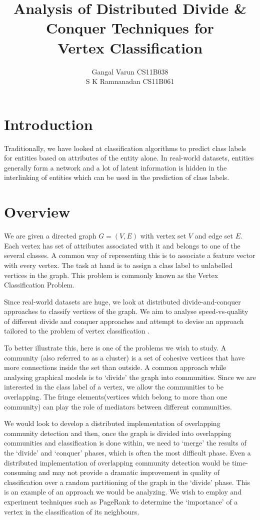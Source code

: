 \documentclass{article}
\begin{document}
\title{\textbf{Analysis of Distributed Divide \& Conquer Techniques for \\Vertex Classification}}
\author{ Gangal Varun CS11B038 \\
		 S K Ramnanadan CS11B061\\
[0.2in]
}
\date{}
\maketitle
\section*{Introduction}
Traditionally, we have looked at classification algorithms to predict class labels for entities based on attributes of the entity alone. In real-world datasets, entities generally form a network and a lot of latent information is hidden in the interlinking of entities which can be used in the prediction of class labels. 
 


\section*{Overview}
We are given a directed graph $G=(V,E)$ with vertex set $V$ and edge set $E$. Each vertex has set of attributes associated with it and belongs to one of the several classes. A common way of representing this is to associate a feature vector with every vertex. The task at hand is to assign a class label to unlabelled vertices in the graph. This problem is commonly known as the Vertex Classification Problem. 

Since real-world datasets are huge, we look at distributed divide-and-conquer approaches to classify vertices of the graph. We aim to analyse speed-vs-quality of different divide and conquer approaches and attempt to devise an approach tailored to the problem of vertex classification . 

To better illustrate this, here is one of the problems we wish to study. A community (also referred to as a cluster) is a set of cohesive vertices that have more connections inside the set than outside. A common approach while analysing graphical models is to ‘divide’ the graph into communities. Since we are interested in the class label of a vertex, we allow the communities to be overlapping. The fringe elements(vertices which belong to more than one community) can play the role of mediators between different communities. 

We would look to develop a distributed implementation of overlapping community detection and then, once the graph is divided into overlapping communities and classification is done within, we need to ‘merge’ the results of the ‘divide’ and ‘conquer’ phases, which is often the most difficult phase. Even a distributed implementation of overlapping community detection would be time-consuming and may not provide a dramatic improvement in quality of classification over a random partitioning of the graph in the ‘divide’ phase. This is an example of an approach we would be analyzing. We wish to employ and experiment techniques such as PageRank to determine the ‘importance’ of a vertex in the classification of its neighbours.
\end{document}
